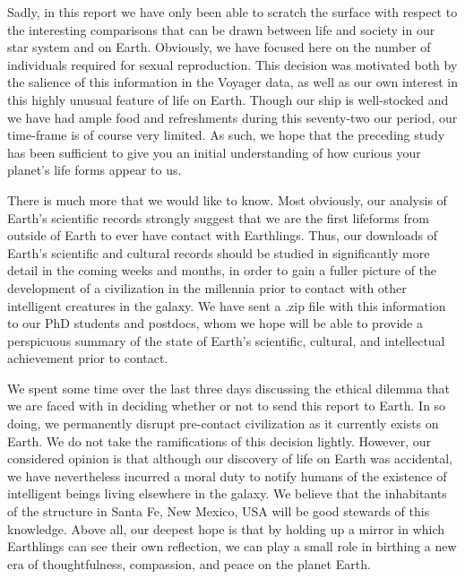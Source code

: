
Sadly, in this report we have only been able to scratch the surface with respect to the interesting comparisons that can be drawn between life and society in our star system and on Earth. Obviously, we have focused here on the number of individuals required for sexual reproduction. This decision was motivated both by the salience of this information in the Voyager data, as well as our own interest in this highly unusual feature of life on Earth. Though our ship is well-stocked and we have had ample food and refreshments during this seventy-two our period, our time-frame is of course very limited. As such, we hope that the preceding study has been sufficient to give you an initial understanding of how curious your planet's life forms appear to us.\par 


There is much more that we would like to know. Most obviously, our analysis of Earth's scientific records strongly suggest that we are the first lifeforms from outside of Earth to ever have contact with Earthlings. Thus, our downloads of Earth's scientific and cultural records should be studied in significantly more detail in the coming weeks and months, in order to gain a fuller picture of the development of a civilization in the millennia prior to contact with other intelligent creatures in the galaxy. We have sent a .zip file with this information to our PhD students and postdocs, whom we hope will be able to provide a perspicuous summary of the state of Earth's scientific, cultural, and intellectual achievement prior to contact.\par 


We spent some time over the last three days discussing the ethical dilemma that we are faced with in deciding whether or not to send this report to Earth. In so doing, we permanently disrupt pre-contact civilization as it currently exists on Earth. We do not take the ramifications of this decision lightly. However, our considered opinion is that although our discovery of life on Earth was accidental, we have nevertheless incurred a moral duty to notify humans of the existence of intelligent beings living elsewhere in the galaxy. We believe that the inhabitants of the structure in Santa Fe, New Mexico, USA will be good stewards of this knowledge. Above all, our deepest hope is that by holding up a mirror in which Earthlings can see their own reflection, we can play a small role in birthing a new era of thoughtfulness, compassion, and peace on the planet Earth.\par 